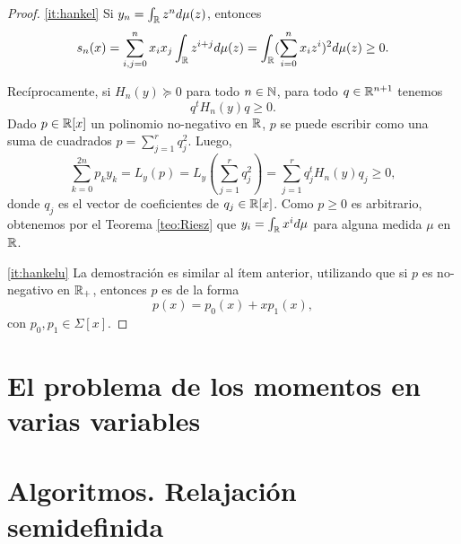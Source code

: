 \begin{proof}
\ref{it:hankel} Si $y_n = \int_{\mathbb{R}} z^n d\mu(z)$, entonces
$$
s_n(x) = \sum_{i,j = 0}^n x_i x_j \int_{\mathbb{R}} z^{i+j} d\mu(z) = \int_{\mathbb{R}} (\sum_{i=0}^n x_i z^i)^2 d\mu(z) \ge 0.
$$

Recíprocamente, si $H_n(y) \succeq 0$ para todo $n \in \mathbb{N}$, para todo $q \in \mathbb{R}^{n+1}$ tenemos
$$
q^t H_n(y) q \ge 0.
$$
Dado $p \in \mathbb{R}[x]$ un polinomio no-negativo en $\mathbb{R}$, $p$ se puede escribir como una suma de cuadrados $p = \sum_{j = 1}^r q_j^2$. Luego,
$$
\sum_{k=0}^{2n} p_k y_k = L_y(p) = L_y(\sum_{j=1}^r q_j^2) = \sum_{j=1}^r q^t_j H_n(y) q_j \ge 0,
$$
donde $q_j$ es el vector de coeficientes de $q_j \in \mathbb{R}[x]$. Como $p \ge 0$ es arbitrario, obtenemos por el Teorema \ref{teo:Riesz} que $y_i = \int_{\mathbb{R}} x^i d\mu$ para alguna medida $\mu$ en $\mathbb{R}$.

\ref{it:hankelu} La demostración es similar al ítem anterior, utilizando que si $p$ es no-negativo en $\mathbb{R}_+$, entonces $p$ es de la forma
$$
p(x) = p_0(x) + x p_1(x),
$$
con $p_0, p_1 \in \Sigma[x]$.
\end{proof}

\section{El problema de los momentos en varias variables}
\section{Algoritmos. Relajaci\'on semidefinida}
